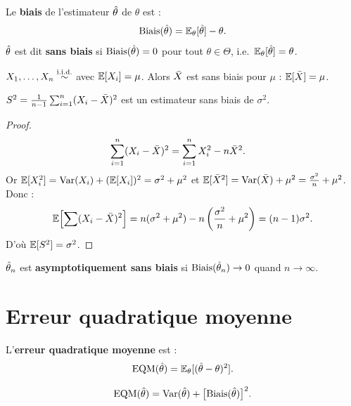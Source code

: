 \begin{definition}[Biais]
Le \textbf{biais} de l'estimateur $\hat{\theta}$ de $\theta$ est :
\[
\operatorname{Biais}(\hat{\theta}) = \mathbb{E}_\theta[\hat{\theta}] - \theta.
\]
$\hat{\theta}$ est dit \textbf{sans biais} si $\operatorname{Biais}(\hat{\theta})=0$ pour tout $\theta\in\Theta$, i.e.\ $\mathbb{E}_\theta[\hat{\theta}]=\theta$.
\end{definition}

\begin{exemple}
$X_1,\ldots,X_n\overset{\text{i.i.d.}}{\sim}$ avec $\mathbb{E}[X_i]=\mu$. Alors $\bar{X}$ est sans biais pour $\mu$ : $\mathbb{E}[\bar{X}]=\mu$.
\end{exemple}

\begin{proposition}
$S^2=\frac{1}{n-1}\sum_{i=1}^n(X_i-\bar{X})^2$ est un estimateur sans biais de $\sigma^2$.
\end{proposition}

\begin{proof}
\begin{align*}
\sum_{i=1}^n(X_i-\bar{X})^2 &= \sum_{i=1}^n X_i^2 - n\bar{X}^2.
\end{align*}
Or $\mathbb{E}[X_i^2]=\operatorname{Var}(X_i)+(\mathbb{E}[X_i])^2=\sigma^2+\mu^2$ et $\mathbb{E}[\bar{X}^2]=\operatorname{Var}(\bar{X})+\mu^2=\frac{\sigma^2}{n}+\mu^2$. Donc :
\[
\mathbb{E}\!\left[\sum(X_i-\bar{X})^2\right] = n(\sigma^2+\mu^2)-n\left(\frac{\sigma^2}{n}+\mu^2\right) = (n-1)\sigma^2.
\]
D'o\`u $\mathbb{E}[S^2]=\sigma^2$.
\end{proof}

\begin{definition}
$\hat{\theta}_n$ est \textbf{asymptotiquement sans biais} si $\operatorname{Biais}(\hat{\theta}_n)\to 0$ quand $n\to\infty$.
\end{definition}

\section{Erreur quadratique moyenne}

\begin{definition}
L'\textbf{erreur quadratique moyenne} est :
\[
\operatorname{EQM}(\hat{\theta}) = \mathbb{E}_\theta[(\hat{\theta}-\theta)^2].
\]
\end{definition}

\begin{theoreme}
\label{thm:biais-variance}
\[
\operatorname{EQM}(\hat{\theta}) = \operatorname{Var}(\hat{\theta}) + \bigl[\operatorname{Biais}(\hat{\theta})\bigr]^2.
\]
\end{theoreme}

